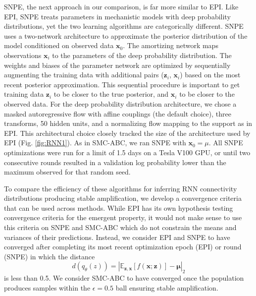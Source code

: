 \documentclass[11pt]{article}
\begin{document}
SNPE, the next approach in our comparison, is far more similar to EPI.
Like EPI, SNPE treats parameters in mechanistic models with deep probability distributions, yet the two learning algorithms are categorically different.
SNPE uses a two-network architecture to approximate the posterior distribution of the model conditioned on observed data $\mathbf{x}_0$.
The amortizing network maps observations $\mathbf{x}_i$ to the parameters of the deep probability distribution. 
The weights and biases of the parameter network are optimized by sequentially augmenting the training data with additional pairs ($\mathbf{z}_i$, $\mathbf{x}_i$) based on the most recent posterior approximation.
This sequential procedure is important to get training data $\mathbf{z}_i$ to be closer to the true posterior, and $\mathbf{x}_i$ to be closer to the observed data.
For the deep probability distribution architecture, we chose a masked autoregressive flow with affine couplings (the default choice), three transforms, 50 hidden units, and a normalizing flow mapping to the support as in EPI.
This architectural choice closely tracked the size of the architecture used by EPI (Fig. \ref{fig:RNN1}).
As in SMC-ABC, we ran SNPE with $\mathbf{x}_0 = \mu$.
All SNPE optimizations were run for a limit of 1.5 days on a Tesla V100 GPU, or until two consecutive rounds resulted in a validation log probability lower than the maximum observed for that random seed.

To compare the efficiency of these algorithms for inferring RNN connectivity distributions producing stable amplification, we develop a convergence criteria that can be used across methods.
While EPI has its own hypothesis testing convergence criteria for the emergent property, it would not make sense to use this criteria on SNPE and SMC-ABC which do not constrain the means and variances of their predictions.
Instead, we consider EPI and SNPE to have converged after completing its most recent optimization epoch (EPI) or round (SNPE) in which the distance
\begin{equation}
d(q_\theta(z)) = |\mathbb{E}_{\mathbf{z}, \mathbf{x}} \left[f(\mathbf{x}; \mathbf{z}) \right] - \bm{\mu}|_2
\end{equation}
is less than 0.5.
We consider SMC-ABC to have converged once the population produces samples within the $\epsilon = 0.5$ ball ensuring stable amplification.
\end{document}
